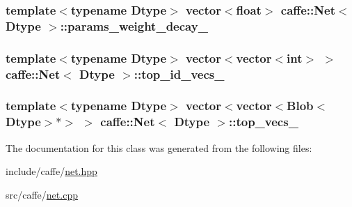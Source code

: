 \hypertarget{classcaffe_1_1_net_ad337cf5b16e69533f605dbe1f6932bc9}{
\subsubsection[{params\+\_\+weight\+\_\+decay\+\_\+}]{\setlength{\rightskip}{0pt plus 5cm}template$<$typename Dtype$>$ vector$<$float$>$ {\bf caffe\+::\+Net}$<$ Dtype $>$\+::params\+\_\+weight\+\_\+decay\+\_\+\hspace{0.3cm}{\ttfamily [protected]}}}\label{classcaffe_1_1_net_ad337cf5b16e69533f605dbe1f6932bc9}
\hypertarget{classcaffe_1_1_net_aacacd1d6a07c61694433d4ce5ca8b0be}{
\subsubsection[{top\+\_\+id\+\_\+vecs\+\_\+}]{\setlength{\rightskip}{0pt plus 5cm}template$<$typename Dtype$>$ vector$<$vector$<$int$>$ $>$ {\bf caffe\+::\+Net}$<$ Dtype $>$\+::top\+\_\+id\+\_\+vecs\+\_\+\hspace{0.3cm}{\ttfamily [protected]}}}\label{classcaffe_1_1_net_aacacd1d6a07c61694433d4ce5ca8b0be}
\hypertarget{classcaffe_1_1_net_aa834096a02382d9a881bf33694e72564}{
\subsubsection[{top\+\_\+vecs\+\_\+}]{\setlength{\rightskip}{0pt plus 5cm}template$<$typename Dtype$>$ vector$<$vector$<${\bf Blob}$<$Dtype$>$$\ast$$>$ $>$ {\bf caffe\+::\+Net}$<$ Dtype $>$\+::top\+\_\+vecs\+\_\+\hspace{0.3cm}{\ttfamily [protected]}}}\label{classcaffe_1_1_net_aa834096a02382d9a881bf33694e72564}


The documentation for this class was generated from the following files\+:\begin{DoxyCompactItemize}
\item 
include/caffe/\hyperlink{net_8hpp}{net.\+hpp}\item 
src/caffe/\hyperlink{net_8cpp}{net.\+cpp}\end{DoxyCompactItemize}
